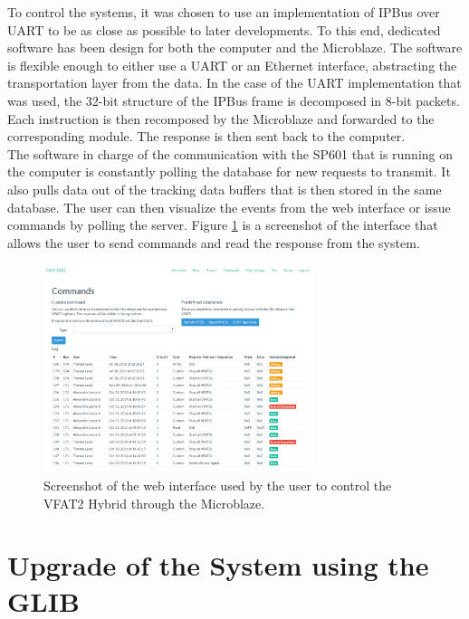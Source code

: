       To control the systems, it was chosen to use an implementation of IPBus over UART to be as close as possible to later developments. To this end, dedicated software has been design for both the computer and the Microblaze. The software is flexible enough to either use a UART or an Ethernet interface, abstracting the transportation layer from the data. In the case of the UART implementation that was used, the 32-bit structure of the IPBus frame is decomposed in 8-bit packets. Each instruction is then recomposed by the Microblaze and forwarded to the corresponding module. The response is then sent back to the computer. \\

      The software in charge of the communication with the SP601 that is running on the computer is constantly polling the database for new requests to transmit. It also pulls data out of the tracking data buffers that is then stored in the same database. The user can then visualize the events from the web interface or issue commands by polling the server. Figure \ref{fig:III-1-app-cmd} is a screenshot of the interface that allows the user to send commands and read the response from the system.

      \begin{figure}[h!]
        \centering
        \includegraphics[width=0.7\textwidth]{img/III-1-arch/app-cmd.png}
        \caption{Screenshot of the web interface used by the user to control the VFAT2 Hybrid through the Microblaze.}
        \label{fig:III-1-app-cmd}
      \end{figure}

  \section{Upgrade of the System using the GLIB}

